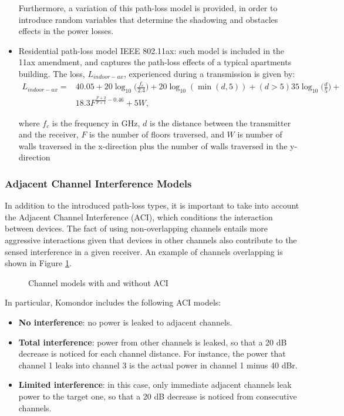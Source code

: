 \documentclass[a4paper]{article}
\begin{document}
\begin{itemize}
			Furthermore, a variation of this path-loss model is provided, in order to introduce random variables that determine the shadowing and obstacles effects in the power losses.
			\item Residential path-loss model IEEE 802.11ax: such model is included in the 11ax amendment, and captures the path-loss effects of a typical apartments building. The loss, $L_{indoor-ax}$, experienced during a transmission is given by:
			\begin{equation}
				\begin{aligned}
				L_{indoor-ax} = &40.05 + 20 \log_{10}\Big(\frac{f_c}{2.4}\Big) + 20 \log_{10}(\min(d,5)) + (d>5)  35 \log_{10}\Big(\frac{d}{5}\Big) + \\
				&18.3 F^{\frac{F+2}{F+1}-0.46} + 5 W,
				\end{aligned}
				\nonumber
			\end{equation}

			where $f_c$ is the frequency in GHz, $d$ is the distance between the transmitter and the receiver, $F$ is the number of floors traversed, and $W$ is number of walls traversed in the x-direction plus the number of walls traversed in the y-direction
		\end{itemize}	
	
		\subsubsection{Adjacent Channel Interference Models}
		In addition to the introduced path-loss types, it is important to take into account the Adjacent Channel Interference (ACI), which conditions the interaction between devices. The fact of using non-overlapping channels entails more aggressive interactions given that devices in other channels also contribute to the sensed interference in a given receiver. An example of channels overlapping is shown in Figure \ref{fig:cochannel_interference}.
		\begin{figure}[h!]
			\centering
			\caption{Channel models with and without ACI}
			\label{fig:cochannel_interference}
		\end{figure}	
		
		In particular, Komondor includes the following ACI models:		
		\begin{itemize}
			\item \textbf{No interference}: no power is leaked to adjacent channels.
			\item \textbf{Total interference}: power from other channels is leaked, so that a 20 dB decrease is noticed for each channel distance. For instance, the power that channel 1 leaks into channel 3 is the actual power in channel 1 minus 40 dBr. 
			\item \textbf{Limited interference}: in this case, only immediate adjacent channels leak power to the target one, so that a 20 dB decrease is noticed from consecutive channels.
		\end{itemize}
				
\end{document}
